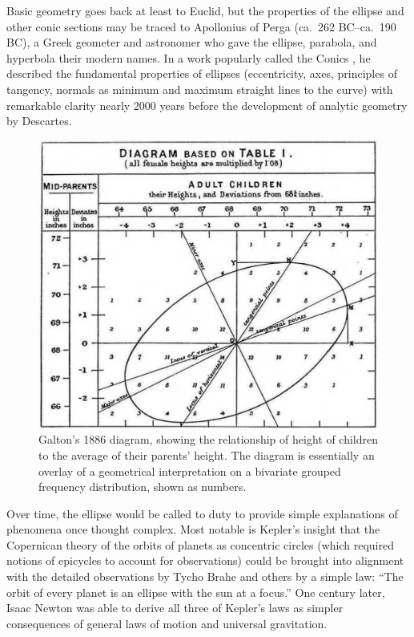 \documentclass[11pt]{article}%
\begin{document}
Basic geometry goes back at least to Euclid, but the properties of the ellipse and  other
conic sections may be traced to Apollonius  of Perga (ca.~262 BC--ca.~190 BC),  a
Greek geometer and astronomer who gave the ellipse, parabola, and hyperbola their
modern names. In a work popularly called the Conics \citep{Boyer:91}, he  described
the  fundamental  properties  of  ellipses  (eccentricity,  axes,  principles of
tangency,  normals as  minimum and  maximum straight  lines to  the curve)  with
remarkable clarity nearly 2000 years before the development of analytic geometry
by Descartes.

\begin{figure}[htb]
  \centering
  \includegraphics[width=.75\textwidth]{fig/galton-corr}
  \caption{Galton's 1886 diagram, showing the relationship of height of children
to the average of their parents' height. The diagram is essentially an overlay
of a geometrical interpretation on a bivariate grouped frequency distribution, shown
as numbers.}%
  \label{fig:galton-corr}
\end{figure}

Over time, the ellipse would be called to duty to provide simple explanations of
phenomena  once thought  complex.  Most  notable is  Kepler's insight  that the
Copernican theory of the orbits of planets as concentric circles (which required
notions  of  epicycles  to  account  for  observations)  could  be  brought into
alignment with the detailed observations by  Tycho Brahe and others by a  simple
law: ``The orbit  of every planet  is an ellipse  with the sun  at a focus.''  One
century later, Isaac  Newton was able  to derive all  three of Kepler's  laws as
simpler consequences of general laws of motion and universal gravitation.
\end{document}
